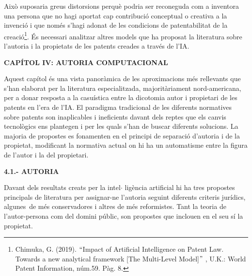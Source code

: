 \documentclass[12pt]{article}
\renewcommand{\_}{\kern-1.5pt\textunderscore\kern-1.5pt}
\begin{document}
\begin{itemize}
\begin{justify}
Això suposaria greus distorsions perquè podria ser reconeguda com a inventora una persona que no hagi aportat cap contribució conceptual o creativa a la invenció i que només s’hagi adonat de les condicions de patentabilitat de la creació\footnote{ Chimuka, G. (2019). $``$Impact of Artificial Intelligence on Patent Law. Towards a new analytical framework [The Multi-Level Model]$"$ , U.K.: World Patent Information, núm.59. Pàg. 8. }. És necessari analitzar altres models que ha proposat la literatura sobre l’autoria i la propietats de les patents creades a través de l’IA. 
\end{justify}\par


\vspace{\baselineskip}
\begin{Center}
{\fontsize{16pt}{19.2pt}\selectfont \textbf{CAPÍTOL IV: AUTORIA COMPUTACIONAL}\par}
\end{Center}\par


\vspace{\baselineskip}
\begin{justify}
Aquest capítol és una vista panoràmica de les aproximacions més rellevants que s’han elaborat per la literatura especialitzada, majoritàriament nord-americana, per a donar resposta a la casuística entre la dicotomia autor i propietari de les patents en l’era de l’IA. El paradigma tradicional de les diferents normatives sobre patents son inaplicables i ineficients davant dels reptes que els canvis tecnològics ens plantegen i per les quals s’han de buscar diferents solucions. La majoria de propostes es fonamenten en el principi de separació d’autoria i de la propietat, modificant la normativa actual on hi ha un automatisme entre la figura de l’autor i la del propietari. 
\end{justify}\par


\vspace{\baselineskip}
\begin{justify}
\textbf{4.1.- AUTORIA}
\end{justify}\par


\vspace{\baselineskip}

\vspace{\baselineskip}
\begin{justify}
Davant dels resultats creats per la intel$ \cdot $ ligència artificial hi ha tres propostes principals de literatura per assignar-ne l’autoria seguint diferents criteris jurídics, algunes\ de més  conservadores i altres de més reformistes. Tant la teoria de l’autor-persona com del domini públic, son propostes que inclouen en el seu sí la propietat. 
\end{justify}\par



\end{itemize}
\end{document}
